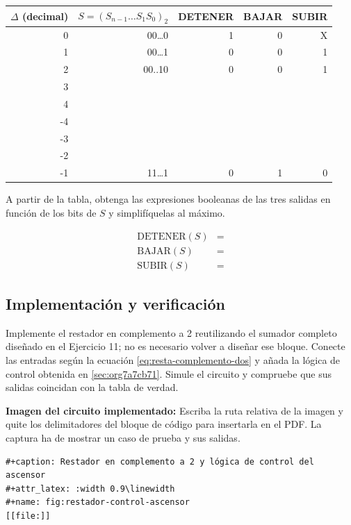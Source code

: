 \documentclass[11pt]{article}
\begin{document}
\begin{center}
\begin{tabular}{rrrrr}
\(\Delta\) (decimal) & \(S=(S_{n-1}\dots S_1S_0)_2\) & DETENER & BAJAR & SUBIR\\[0pt]
\hline
0 & 00\ldots{}0 & 1 & 0 & X\\[0pt]
1 & 00\ldots{}1 & 0 & 0 & 1\\[0pt]
2 & 00..10 & 0 & 0 & 1\\[0pt]
3 &  &  &  & \\[0pt]
4 &  &  &  & \\[0pt]
-4 &  &  &  & \\[0pt]
-3 &  &  &  & \\[0pt]
-2 &  &  &  & \\[0pt]
-1 & 11\ldots{}1 & 0 & 1 & 0\\[0pt]
\end{tabular}
\end{center}

A partir de la tabla, obtenga las expresiones booleanas de las tres
salidas en función de los bits de \(S\) y simplifíquelas al máximo.

\begin{align*}
  \text{DETENER}(S) &= \\
  \text{BAJAR}(S) &= \\
  \text{SUBIR}(S) &=
\end{align*}

\subsection{Implementación y verificación}
\label{sec:org53879b5}
Implemente el restador en complemento a 2 reutilizando el sumador
completo diseñado en el Ejercicio 11; no es necesario volver a diseñar
ese bloque. Conecte las entradas según la ecuación \ref{eq:resta-complemento-dos}
y añada la lógica de control obtenida en \ref{sec:org7a7cb71}. Simule el circuito y
compruebe que sus salidas coincidan con la tabla de verdad.

\textbf{Imagen del circuito implementado:} Escriba la ruta relativa de la
imagen y quite los delimitadores del bloque de código para insertarla
en el PDF. La captura ha de mostrar un caso de prueba y sus salidas.

\begin{verbatim}
#+caption: Restador en complemento a 2 y lógica de control del ascensor
#+attr_latex: :width 0.9\linewidth
#+name: fig:restador-control-ascensor
[[file:]]
\end{verbatim}
\end{document}
